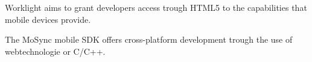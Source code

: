 Worklight aims to grant developers access trough HTML5 to the capabilities that mobile devices provide. 





The MoSync mobile SDK offers cross-platform development trough the use of webtechnologie or C/C++.









